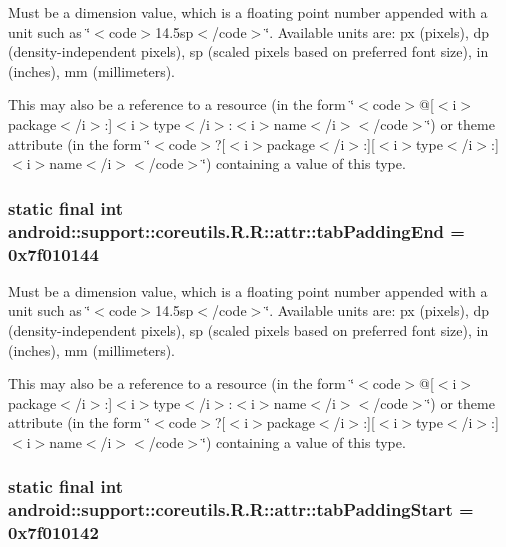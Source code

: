 Must be a dimension value, which is a floating point number appended with a unit such as \char`\"{}$<$code$>$14.5sp$<$/code$>$\char`\"{}. Available units are: px (pixels), dp (density-independent pixels), sp (scaled pixels based on preferred font size), in (inches), mm (millimeters). 

This may also be a reference to a resource (in the form \char`\"{}$<$code$>$@\mbox{[}$<$i$>$package$<$/i$>$:\mbox{]}$<$i$>$type$<$/i$>$:$<$i$>$name$<$/i$>$$<$/code$>$\char`\"{}) or theme attribute (in the form \char`\"{}$<$code$>$?\mbox{[}$<$i$>$package$<$/i$>$:\mbox{]}\mbox{[}$<$i$>$type$<$/i$>$:\mbox{]}$<$i$>$name$<$/i$>$$<$/code$>$\char`\"{}) containing a value of this type. \hypertarget{classandroid_1_1support_1_1coreutils_1_1_r_1_1attr_9d19acc26d9d7c7844b20e679a333585}{
\subsubsection[{tabPaddingEnd}]{\setlength{\rightskip}{0pt plus 5cm}static final int android::support::coreutils.R.R::attr::tabPaddingEnd = 0x7f010144}}
\label{classandroid_1_1support_1_1coreutils_1_1_r_1_1attr_9d19acc26d9d7c7844b20e679a333585}


Must be a dimension value, which is a floating point number appended with a unit such as \char`\"{}$<$code$>$14.5sp$<$/code$>$\char`\"{}. Available units are: px (pixels), dp (density-independent pixels), sp (scaled pixels based on preferred font size), in (inches), mm (millimeters). 

This may also be a reference to a resource (in the form \char`\"{}$<$code$>$@\mbox{[}$<$i$>$package$<$/i$>$:\mbox{]}$<$i$>$type$<$/i$>$:$<$i$>$name$<$/i$>$$<$/code$>$\char`\"{}) or theme attribute (in the form \char`\"{}$<$code$>$?\mbox{[}$<$i$>$package$<$/i$>$:\mbox{]}\mbox{[}$<$i$>$type$<$/i$>$:\mbox{]}$<$i$>$name$<$/i$>$$<$/code$>$\char`\"{}) containing a value of this type. \hypertarget{classandroid_1_1support_1_1coreutils_1_1_r_1_1attr_2a6441ede352f348f010fd70d58b7de6}{
\subsubsection[{tabPaddingStart}]{\setlength{\rightskip}{0pt plus 5cm}static final int android::support::coreutils.R.R::attr::tabPaddingStart = 0x7f010142}}
\label{classandroid_1_1support_1_1coreutils_1_1_r_1_1attr_2a6441ede352f348f010fd70d58b7de6}


